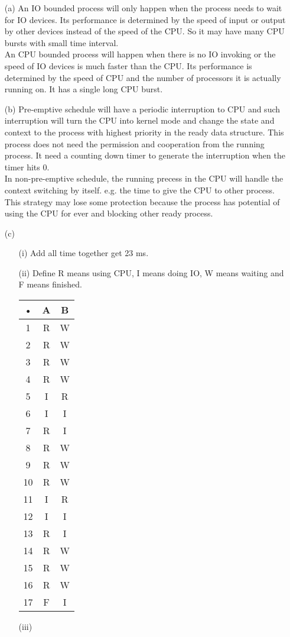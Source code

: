 \documentclass[10pt,twoside,a4paper]{article}
\begin{document}
\begin{itemize}
\item[(a)]
An IO bounded process will only happen when the process needs to wait for IO devices. Its performance is determined by the speed of input or output by other devices instead of the speed of the CPU. So it may have many CPU bursts with small time interval.
\\An CPU bounded process will happen when there is no IO invoking or the speed of IO devices is much faster than the CPU. Its performance is determined by the speed of CPU and the number of processors it is actually running on. It has a single long CPU burst.
\item[(b)]
Pre-emptive schedule will have a periodic interruption to CPU and such interruption will turn the CPU into kernel mode and change the state and context to the process with highest priority in the ready data structure. This process does not need the permission and cooperation from the running process. It need a counting down timer to generate the interruption when the timer hits 0.
\\In non-pre-emptive schedule, the running precess in the CPU will handle the context switching by itself. e.g. the time to give the CPU to other process. This strategy may lose some protection because the process has potential of using the CPU for ever and blocking other ready process.
\item[(c)]
\begin{itemize}
\item[(i)]
Add all time together get 23 ms.
\item[(ii)]
Define R means using CPU, I means doing IO, W means waiting and F means finished.
 
\begin{tabular}{|c|c|c|}
\hline 
• & A & B \\ 
\hline 
1 & R & W \\ 
\hline 
2 & R & W \\ 
\hline 
3 & R & W \\ 
\hline 
4 & R & W \\ 
\hline 
5 & I & R \\ 
\hline 
6 & I & I \\ 
\hline 
7 & R & I \\ 
\hline 
8 & R & W \\ 
\hline 
9 & R & W \\ 
\hline 
10 & R & W \\ 
\hline 
11 & I & R \\ 
\hline 
12 & I & I \\ 
\hline 
13 & R & I \\ 
\hline 
14 & R & W \\ 
\hline 
15 & R & W \\ 
\hline 
16 & R & W \\ 
\hline 
17 & F & I \\ 
\hline 
\end{tabular} 
\item[(iii)]


\end{itemize}
\end{itemize}
\end{document}
